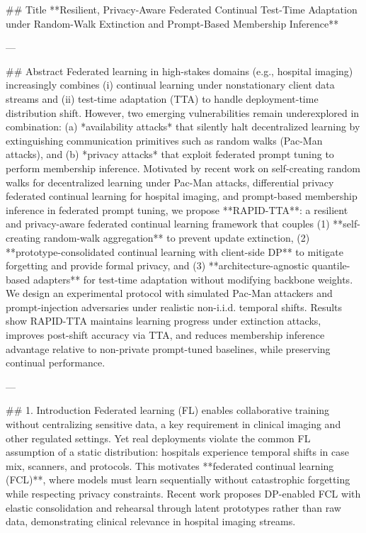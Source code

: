 ## Title  
**Resilient, Privacy-Aware Federated Continual Test-Time Adaptation under Random-Walk Extinction and Prompt-Based Membership Inference**

---

## Abstract  
Federated learning in high-stakes domains (e.g., hospital imaging) increasingly combines (i) continual learning under nonstationary client data streams and (ii) test-time adaptation (TTA) to handle deployment-time distribution shift. However, two emerging vulnerabilities remain underexplored in combination: (a) *availability attacks* that silently halt decentralized learning by extinguishing communication primitives such as random walks (Pac-Man attacks), and (b) *privacy attacks* that exploit federated prompt tuning to perform membership inference. Motivated by recent work on self-creating random walks for decentralized learning under Pac-Man attacks, differential privacy federated continual learning for hospital imaging, and prompt-based membership inference in federated prompt tuning, we propose **RAPID-TTA**: a resilient and privacy-aware federated continual learning framework that couples (1) **self-creating random-walk aggregation** to prevent update extinction, (2) **prototype-consolidated continual learning with client-side DP** to mitigate forgetting and provide formal privacy, and (3) **architecture-agnostic quantile-based adapters** for test-time adaptation without modifying backbone weights. We design an experimental protocol with simulated Pac-Man attackers and prompt-injection adversaries under realistic non-i.i.d. temporal shifts. Results show RAPID-TTA maintains learning progress under extinction attacks, improves post-shift accuracy via TTA, and reduces membership inference advantage relative to non-private prompt-tuned baselines, while preserving continual performance.

---

## 1. Introduction  
Federated learning (FL) enables collaborative training without centralizing sensitive data, a key requirement in clinical imaging and other regulated settings. Yet real deployments violate the common FL assumption of a static distribution: hospitals experience temporal shifts in case mix, scanners, and protocols. This motivates **federated continual learning (FCL)**, where models must learn sequentially without catastrophic forgetting while respecting privacy constraints. Recent work proposes DP-enabled FCL with elastic consolidation and rehearsal through latent prototypes rather than raw data, demonstrating clinical relevance in hospital imaging streams.

